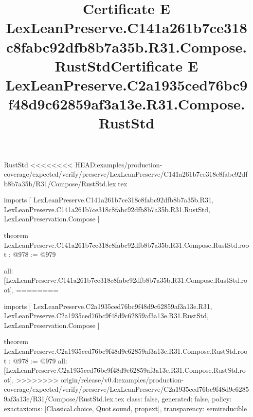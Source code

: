 \begin{lexlean}{RustStd}
<<<<<<<< HEAD:examples/production-coverage/expected/verify/preserve/LexLeanPreserve/C141a261b7ce318c8fabc92dfb8b7a35b/R31/Compose/RustStd.lex.tex
\title{Certificate E LexLeanPreserve.C141a261b7ce318c8fabc92dfb8b7a35b.R31.Compose.RustStd}
\begin{coremodule}
imports [
  LexLeanPreserve.C141a261b7ce318c8fabc92dfb8b7a35b.R31,
  LexLeanPreserve.C141a261b7ce318c8fabc92dfb8b7a35b.R31.RustStd,
  LexLeanPreservation.Compose
]

theorem LexLeanPreserve.C141a261b7ce318c8fabc92dfb8b7a35b.R31.Compose.RustStd.root : @978 := @979 {
  all: [LexLeanPreserve.C141a261b7ce318c8fabc92dfb8b7a35b.R31.Compose.RustStd.root],
========
\title{Certificate E LexLeanPreserve.C2a1935ced76bc9f48d9c62859af3a13e.R31.Compose.RustStd}
\begin{coremodule}
imports [
  LexLeanPreserve.C2a1935ced76bc9f48d9c62859af3a13e.R31,
  LexLeanPreserve.C2a1935ced76bc9f48d9c62859af3a13e.R31.RustStd,
  LexLeanPreservation.Compose
]

theorem LexLeanPreserve.C2a1935ced76bc9f48d9c62859af3a13e.R31.Compose.RustStd.root : @978 := @979 {
  all: [LexLeanPreserve.C2a1935ced76bc9f48d9c62859af3a13e.R31.Compose.RustStd.root],
>>>>>>>> origin/release/v0.4:examples/production-coverage/expected/verify/preserve/LexLeanPreserve/C2a1935ced76bc9f48d9c62859af3a13e/R31/Compose/RustStd.lex.tex
  class: false,
  generated: false,
  policy: exact{axioms: [Classical.choice, Quot.sound, propext]},
  transparency: semireducible
}


\end{coremodule}}
\end{coremodule}
\end{lexlean}
